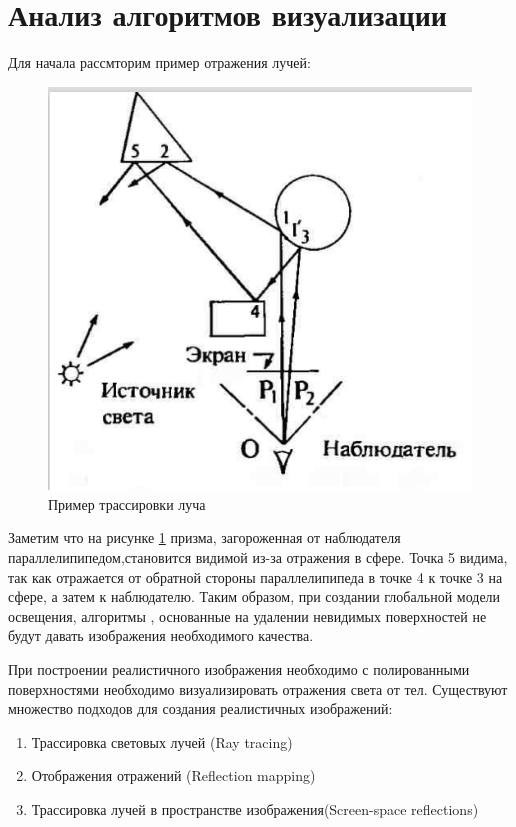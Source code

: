 \documentclass[a4paper,14pt, unknownkeysallowed]{extreport}
\begin{document}
\section[Анализ алгоритмов создания отражений]{Анализ алгоритмов визуализации}

Для начала рассмторим пример отражения лучей:

\begin{figure}[H]
	\centering
	\includegraphics{global_model_light.png}
	\caption{Пример трассировки луча}
	\label{fig:global_model_light}
\end{figure} 

Заметим что на рисунке \ref{fig:global_model_light}  призма, загороженная от наблюдателя параллелипипедом,становится видимой из-за отражения в сфере.
Точка 5 видима, так как отражается от обратной стороны параллелипипеда в точке 4 к точке 3 на сфере, а затем к наблюдателю.
Таким образом, при создании глобальной модели освещения, алгоритмы , основанные на удалении невидимых поверхностей не будут давать изображения необходимого качества.


При построении реалистичного изображения необходимо с полированными поверхностями необходимо визуализировать отражения света от тел.
Существуют множество подходов для создания реалистичных изображений:
\begin{enumerate}
	\item Трассировка световых лучей (Ray tracing)
	\item Отображения отражений (Reflection mapping)
	\item Трассировка лучей в пространстве изображения(Screen-space reflections)
\end{enumerate}
\end{document}
